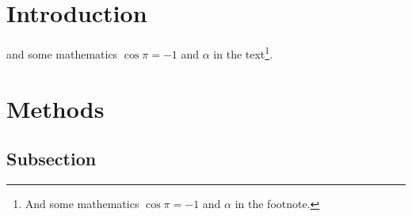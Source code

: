 \documentclass[fleqn,10pt]{SelfArx}\usepackage[]{graphicx}\usepackage[]{color}
\affiliation{\textsuperscript{1}\textit{General Education Coordinator, Ferris State University}} %
\begin{document}

\flushbottom %

\maketitle %

\tableofcontents %

{
	\fancyhf{}
}
\thispagestyle{firststyle}


\section{Introduction} %

\lipsum[1] %
 and some mathematics $\cos\pi=-1$ and $\alpha$ in the text\footnote{And some mathematics $\cos\pi=-1$ and $\alpha$ in the footnote.}.


\section{Methods}

\subsection{Subsection}
\lipsum[1]
\lipsum[1]
\end{document}
